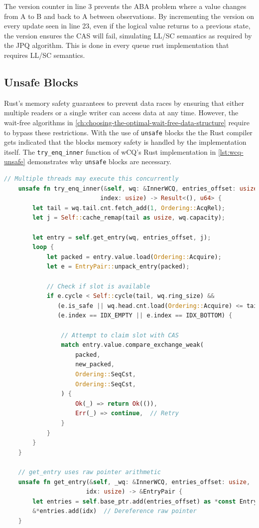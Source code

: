 The version counter in line 3 prevents the ABA problem where a value changes from A to B and back to A between observations. By incrementing the version on every update seen in line 23, even if the logical value returns to a previous state, the version ensures the \ac{CAS} will fail, simulating \ac{LL/SC} semantics as required by the \ac{JPQ} algorithm. This is done in every queue rust implementation that requires \ac{LL/SC} semantics.

\subsection{Unsafe Blocks}

Rust's memory safety guarantees to prevent data races by ensuring that either multiple readers or a single writer can access data at any time. However, the wait-free algorithms in \cref{ch:choosing-the-optimal-wait-free-data-structure} require to bypass these restrictions. With the use of \texttt{unsafe} blocks the the Rust compiler gets indicated that the blocks memory safety is handled by the implementation itself. The \texttt{try\_enq\_inner} function of \ac{wCQ}'s Rust implementation in \cref{lst:wcq-unsafe} demonstrates why \texttt{unsafe} blocks are necessary.

\begin{lstlisting}[language=Rust, style=boxed, caption={Wait-free synchronization requiring unsafe}, label={lst:wcq-unsafe}]
    // Multiple threads may execute this concurrently
    unsafe fn try_enq_inner(&self, wq: &InnerWCQ, entries_offset: usize,
                           index: usize) -> Result<(), u64> {
        let tail = wq.tail.cnt.fetch_add(1, Ordering::AcqRel);
        let j = Self::cache_remap(tail as usize, wq.capacity);
        
        let entry = self.get_entry(wq, entries_offset, j);
        loop {
            let packed = entry.value.load(Ordering::Acquire);
            let e = EntryPair::unpack_entry(packed);
            
            // Check if slot is available
            if e.cycle < Self::cycle(tail, wq.ring_size) &&
               (e.is_safe || wq.head.cnt.load(Ordering::Acquire) <= tail) &&
               (e.index == IDX_EMPTY || e.index == IDX_BOTTOM) {
                
                // Attempt to claim slot with CAS
                match entry.value.compare_exchange_weak(
                    packed,
                    new_packed,
                    Ordering::SeqCst,
                    Ordering::SeqCst,
                ) {
                    Ok(_) => return Ok(()),
                    Err(_) => continue,  // Retry
                }
            }
        }
    }
    
    // get_entry uses raw pointer arithmetic
    unsafe fn get_entry(&self, _wq: &InnerWCQ, entries_offset: usize, 
                       idx: usize) -> &EntryPair {
        let entries = self.base_ptr.add(entries_offset) as *const EntryPair;
        &*entries.add(idx)  // Dereference raw pointer
    }
\end{lstlisting}

